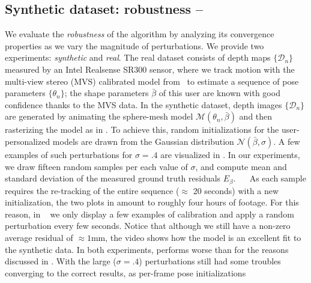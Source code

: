 \subsection{Synthetic dataset: robustness -- }
\label{sec:evalsynth}
We evaluate the \emph{robustness} of the algorithm by analyzing its convergence properties as we vary the magnitude of perturbations.
We provide two experiments: \emph{synthetic} and \emph{real}. The real dataset consists of depth maps $\{\mathcal{D}_n\}$ measured by an Intel Realsense SR300 sensor, where we track motion with the multi-view stereo (MVS) calibrated model from~\cite{tkach2016sphere} to estimate a sequence of pose parameters $\{ \theta_n \}$; the shape parameters $\bar\beta$ of this user are known with good confidence thanks to the MVS data. In the synthetic dataset, depth images $\{\mathcal{D}_n\}$ are generated by animating the sphere-mesh model $\mathcal{M}(\theta_n, \bar\beta)$ and then rasterizing the model as in .
To achieve this, random initializations for the user-personalized models are drawn from the Gaussian distribution {\small $\mathcal{N}(\bar\beta, \sigma)$}. A few examples of such perturbations for $\sigma=.4$ are visualized in .
In our experiments, we draw fifteen random samples per each value of $\sigma$, and compute mean and standard deviation of the measured ground truth residuals $E_\beta$. 
$\quad$
As each sample requires the re-tracking of the entire sequence ($\approx$ 20 seconds) with a new initialization, the two plots in  amount to roughly four hours of footage. For this reason, in ~\VideoSynth{} we only display a few examples of calibration 
and apply a random perturbation every few seconds.
Notice that although we still have a non-zero average residual of $\approx 1$mm, the video shows how the model is an excellent fit to the synthetic data.  
In both experiments, \OfflineHard{} performs worse than \OfflineSoft{} for the reasons discussed in . With the large ($\sigma=.4$) perturbations \OfflineSoft{} still had some troubles converging to the correct results, as per-frame pose initializations 
